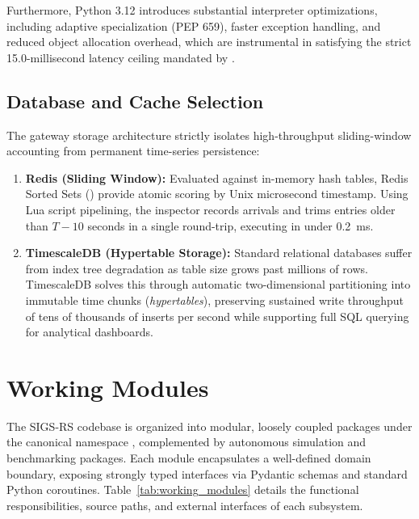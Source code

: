 \documentclass[a4paper]{article}
\begin{document}
Furthermore, Python 3.12 introduces substantial interpreter optimizations, including adaptive specialization (PEP 659), faster exception handling, and reduced object allocation overhead, which are instrumental in satisfying the strict 15.0-millisecond latency ceiling mandated by .

\subsection{Database and Cache Selection}
The gateway storage architecture strictly isolates high-throughput sliding-window accounting from permanent time-series persistence:
\begin{enumerate}
    \item \textbf{Redis (Sliding Window):} Evaluated against in-memory hash tables, Redis Sorted Sets () provide atomic scoring by Unix microsecond timestamp. Using Lua script pipelining, the inspector records arrivals and trims entries older than $T - 10$ seconds in a single round-trip, executing in under 0.2~ms.
    \item \textbf{TimescaleDB (Hypertable Storage):} Standard relational databases suffer from index tree degradation as table size grows past millions of rows. TimescaleDB solves this through automatic two-dimensional partitioning into immutable time chunks (\emph{hypertables}), preserving sustained write throughput of tens of thousands of inserts per second while supporting full SQL querying for analytical dashboards.
\end{enumerate}

\section{Working Modules}

The SIGS-RS codebase is organized into modular, loosely coupled packages under the canonical namespace , complemented by autonomous simulation and benchmarking packages. Each module encapsulates a well-defined domain boundary, exposing strongly typed interfaces via Pydantic schemas and standard Python coroutines. Table~\ref{tab:working_modules} details the functional responsibilities, source paths, and external interfaces of each subsystem.
\end{document}
